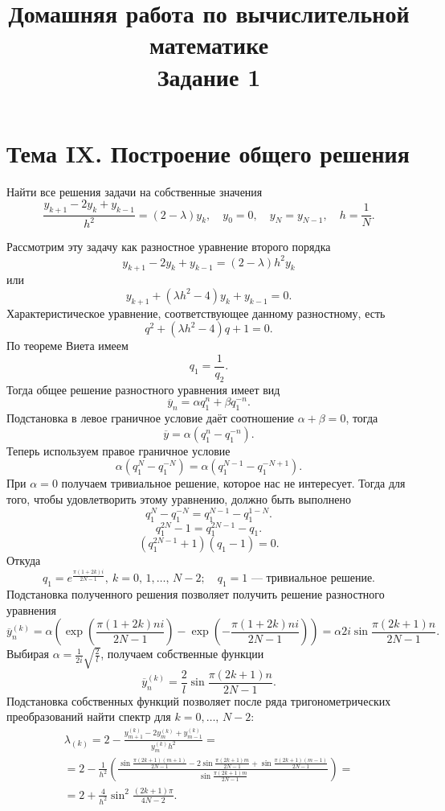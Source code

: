 \documentclass[a4paper]{article}
\title{Домашняя работа по вычислительной математике\\
Задание 1}
\begin{document}
	\maketitle
	\section*{Тема IX. Построение общего решения}	
\begin{hiProb}[7.19]
	Найти все решения задачи на собственные значения
	\[
		\frac{y_{k+1} -2 y_k +y_{k-1}}{h^2}=(2-\lambda)
		y_k,\quad y_0=0,\quad y_N=y_{N-1},\quad
		h=\frac{1}{N}
	.\] 

\end{hiProb}
\begin{sol}
Рассмотрим эту задачу как разностное уравнение второго порядка
\[
	y_{k+1}-2y_k+ y_{k-1}=(2-\lambda)h^2 y_k
\]
или
\[
	y_{k+1}+(\lambda h^2 -4)y_k +y_{k-1}=0
.\] 
Характеристическое уравнение, соответствующее данному разностному,
есть
\[
	q^2 +(\lambda h^2 -4) q+1=0
.\] 
По теореме Виета имеем
\[
q_1= \frac{1}{q_2}
.\] 
Тогда общее решение разностного уравнения имеет вид
\[
\overline{y}_n= \alpha q_1^n +\beta q_1^{-n}
.\] 
Подстановка в левое граничное условие даёт соотношение
$\alpha+\beta=0$, тогда
\[
	\overline{y}= \alpha\left(  q_1^n-q_1^{-n} \right) 
.\] 
Теперь используем правое граничное условие
\[
	\alpha\left( q_1^N-q_1^{-N} \right) =
	\alpha\left( q_{1}^{N-1}-q_1^{-N+1} \right) 
.\] 
При $\alpha=0$ получаем тривиальное решение, которое нас не 
интересует. Тогда для того, чтобы удовлетворить этому уравнению,
должно быть выполнено \[q_1^{N}-q_1^{-N}=q_1^{N-1}-q_1^{1-N}.\]
\[
q_1^{2N}-1=q_1^{2N-1}-q_1
.\] 
\[
	(q_1^{2N-1}+1)(q_1-1)=0
.\] 
Откуда
\[
	q_1=e^{\frac{\pi(1+2k)i}{2N-1}},\
	k=0,\,1,\ldots,\,N-2;\quad
	q_1=1\text{ --- тривиальное решение}
.\] 
Подстановка полученного решения позволяет получить решение
разностного уравнения
\[
	\overline{y}_n ^{(k)}= \alpha \left( 
		\exp \left( \frac{\pi (1+2k) n i}{2N-1} \right) -
	\exp \left( - \frac{\pi (1+2k) n i}{2N-1} \right) \right) =\alpha 2 i \sin \frac{\pi(2k+1)n}{2N-1}
.\] 
Выбирая $\alpha=\frac{1}{2i}\sqrt{\frac{2}{l}} $, получаем
собственные функции
\[
	\overline{y}_n^{(k)}= \frac{2}{l}\sin \frac{\pi(2k+1)n}{2N-1}
.\] 
Подстановка собственных функций позволяет после ряда
тригонометрических преобразований найти спектр
для $k=0,\ldots,\,N-2$:
\begin{multline*}
	\lambda_{(k)}=2 - \frac{y_{m+1}^{(k)}-2 y_{m}^{(k)}+
	y_{m-1}^{(k)}}{y_m^{(k)}h^2}=\\=
	2- \frac{1}{h^2} \left( 
		\frac{\sin \frac{\pi (2k+1)(m+1)}{2N-1}  -
	2 \sin \frac{\pi (2k+1)m}{2N-1}+ \sin \frac{\pi
	(2k+1) (m-1)}{2N-1}}{\sin \frac{\pi (2k+1) m}{2N-1}}\right) =\\=2+\frac{4}{h^2} \sin^2 \frac{(2k+1)\pi}{4N-2} 
.\end{multline*} 
\end{sol}
\end{document}

